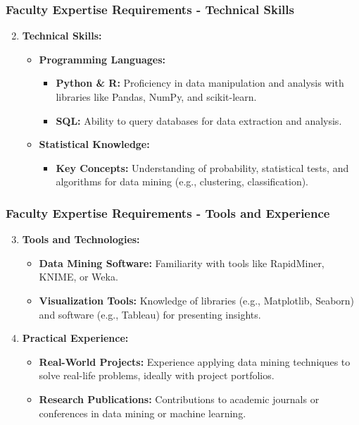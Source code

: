 \documentclass[aspectratio=169]{beamer}
\begin{document}
\begin{frame}[fragile]
  \frametitle{Faculty Expertise Requirements - Technical Skills}
  \begin{enumerate}
    \setcounter{enumi}{1}
    \item \textbf{Technical Skills:}
      \begin{itemize}
        \item \textbf{Programming Languages:}
          \begin{itemize}
            \item \textbf{Python \& R:} Proficiency in data manipulation and analysis with libraries like Pandas, NumPy, and scikit-learn.
            \item \textbf{SQL:} Ability to query databases for data extraction and analysis.
          \end{itemize}
        \item \textbf{Statistical Knowledge:}
          \begin{itemize}
            \item \textbf{Key Concepts:} Understanding of probability, statistical tests, and algorithms for data mining (e.g., clustering, classification).
          \end{itemize}
      \end{itemize}
  \end{enumerate}
\end{frame}

\begin{frame}[fragile]
  \frametitle{Faculty Expertise Requirements - Tools and Experience}
  \begin{enumerate}
    \setcounter{enumi}{2}
    \item \textbf{Tools and Technologies:}
      \begin{itemize}
        \item \textbf{Data Mining Software:} Familiarity with tools like RapidMiner, KNIME, or Weka.
        \item \textbf{Visualization Tools:} Knowledge of libraries (e.g., Matplotlib, Seaborn) and software (e.g., Tableau) for presenting insights.
      \end{itemize}

    \item \textbf{Practical Experience:}
      \begin{itemize}
        \item \textbf{Real-World Projects:} Experience applying data mining techniques to solve real-life problems, ideally with project portfolios.
        \item \textbf{Research Publications:} Contributions to academic journals or conferences in data mining or machine learning.
      \end{itemize}
  \end{enumerate}
\end{frame}
\end{document}
